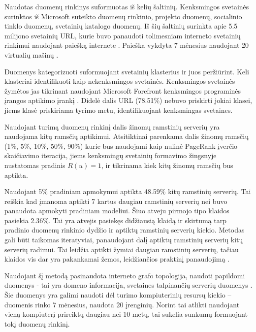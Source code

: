 Naudotas duomenų rinkinys suformuotas iš kelių šaltinių. Kenksmingos svetainės surinktos iš Microsoft suteikto duomenų rinkinio,  projekto duomenų,  socialinio tinklo duomenų,  svetainių katalogo duomenų. Iš šių šaltinių surinkta apie 5.5 milijono svetainių URL, kurie buvo panaudoti tolimesniam interneto svetainių  rinkimui naudojant paiešką internete \cite{linchpins}. Paieška vykdyta 7 mėnesius naudojant 20 virtualių mašinų \cite{linchpins}.

Duomenys kategorizuoti suformuojant svetainių klasterius ir juos peržiūrint. Keli klasteriai identifikuoti kaip nekenksmingos svetainės. Kenksmingos svetainės žymėtos jas tikrinant naudojant Microsoft Forefront kenksmingos programinės įrangos aptikimo įrankį \cite{linchpins}. Didelė dalis URL (78.51\%) nebuvo priskirti jokiai klasei, jiems klasė priskiriama tyrimo metu, identifikuojant kenksmingas svetaines.

Naudojant turimą duomenų rinkinį dalis žinomų ramstinių serverių yra naudojama kitų ramsčių aptikimui. Atsitiktinai parenkama dalis žinomų ramsčių (1\%, 5\%, 10\%, 50\%, 90\%) kurie bus naudojami kaip nulinė PageRank įverčio skaičiavimo iteracija, jiems kenksmingų svetainių formavimo žingsnyje nustatomas pradinis $R(u) = 1$, ir tikrinama kiek kitų žinomų ramsčių bus aptikta.

Naudojant 5\% pradiniam apmokymui aptikta 48.59\% kitų ramstinių serverių. Tai reiškia kad įmanoma aptikti 7 kartus daugiau ramstinių serverių nei buvo panaudota apmokyti pradiniam modeliui. Šiuo atveju pirmojo tipo klaidos pasiekia 2.36\%. Tai yra atvejis pasiekęs didžiausią klaidą ir skirtumą tarp pradinio duomenų rinkinio dydžio ir aptiktų ramstinių serverių kiekio. Metodas gali būti taikomas iteratyviai, panaudojant dalį aptiktų ramstinių serverių kitų serverių radimui. Tai leidžia aptikti žymiai daugiau ramstinių serverių, tačiau klaidos vis dar yra pakankamai žemos, leidžiančios praktinį panaudojimą \cite{linchpins}.

Naudojant šį metodą pasinaudota interneto grafo topologija, naudoti papildomi duomenys - tai yra domeno informacija, svetaines talpinančių serverių duomenys \cite{linchpins}. Šie duomenys yra galimi naudoti dėl turimo kompiuterinių resursų kiekio -- duomenis rinko 7 mėnesius, naudota 20 įrenginių. Norint tai atlikti naudojant vieną kompiuterį prireiktų daugiau nei 10 metų, tai sukelia sunkumų formuojant tokį duomenų rinkinį.
